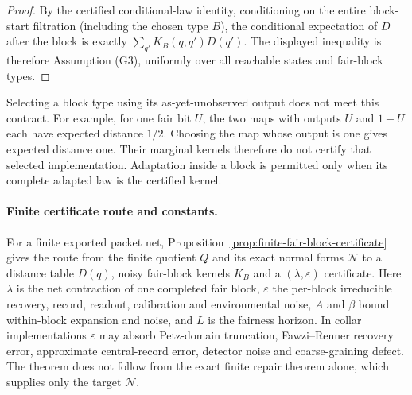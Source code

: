 \documentclass[11pt]{article}
\theoremstyle{remark}
\theoremstyle{plain}
\begin{document}
\begin{proof}
By the certified conditional-law identity, conditioning on the entire
block-start filtration (including the chosen type \(B\)), the
conditional expectation of \(D\) after the block is exactly
\(\sum_{q'}K_B(q,q')D(q')\). The displayed inequality is therefore Assumption (G3), uniformly
over all reachable states and fair-block types.
\end{proof}

Selecting a block type using its as-yet-unobserved output does not meet this
contract. For example, for one fair bit \(U\), the two maps with outputs
\(U\) and \(1-U\) each have expected distance \(1/2\). Choosing the map
whose output is one gives expected distance one. Their marginal kernels
therefore do not certify that selected implementation. Adaptation inside a
block is permitted only when its complete adapted law is the certified
kernel.

\paragraph{Finite certificate route and constants.}
For a finite exported packet net,
Proposition~\ref{prop:finite-fair-block-certificate} gives the route from
the finite quotient \(Q\) and its exact normal forms \(\mathcal N\) to a
distance table \(D(q)\), noisy fair-block kernels \(K_B\) and a
\((\lambda,\varepsilon)\) certificate. Here \(\lambda\) is the net
contraction of one completed fair block, \(\varepsilon\) the per-block
irreducible recovery, record, readout, calibration and environmental noise,
\(A\) and \(\beta\) bound within-block expansion and noise, and \(L\) is the
fairness horizon. In collar implementations \(\varepsilon\) may absorb
Petz-domain truncation, Fawzi--Renner recovery error, approximate
central-record error, detector noise and coarse-graining defect. The
theorem does not follow from the exact finite repair theorem alone, which
supplies only the target \(\mathcal N\).
\end{document}
